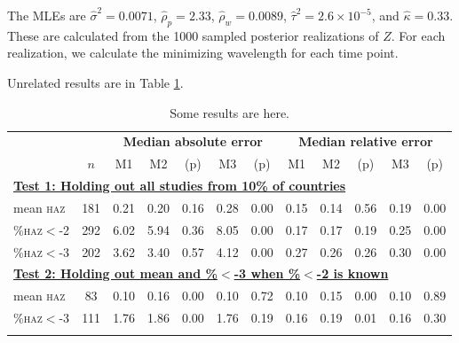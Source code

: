 \documentclass[12pt]{article}
\newcommand\T{\rule{0pt}{3.5ex}}
\begin{document}
The MLEs are $\hat\sigma^2 = 0.0071$, $\hat\rho_p = 2.33$, $\hat\rho_w = 0.0089$, $\hat\tau^2 = 2.6\times 10^{-5}$, and $\hat\kappa = 0.33$. These are calculated from the 1000 sampled posterior realizations of $Z$. For each realization, we calculate the minimizing wavelength for each time point. 

Unrelated results are in Table \ref{tab:results}.
\begin{table}[!t]
\caption{Some results are here.}
\begin{center}
\begin{tabular}{lc||c|cc|cc||c|cc|cc}
\hline
&& \multicolumn{5}{c||}{\textbf{Median absolute error}}& \multicolumn{5}{c}{\textbf{Median relative error}}\\
 & $n$ & M1 & M2 & (p) & M3 & (p) & M1 & M2 & (p) & M3 & (p) \\ 
  \hline
  \multicolumn{12}{l}{\textbf{\underline{Test 1: Holding out all studies from 10\% of countries}}} \T \\
mean \textsc{haz} & 181 & 0.21 & 0.20 & 0.16 & 0.28 & 0.00 & 0.15 & 0.14 & 0.56 & 0.19 & 0.00 \\ 
  \%\textsc{haz}$<$-2 & 292 & 6.02 & 5.94 & 0.36 & 8.05 & 0.00 & 0.17 & 0.17 & 0.19 & 0.25 & 0.00 \\ 
  \%\textsc{haz}$<$-3 & 202 & 3.62 & 3.40 & 0.57 & 4.12 & 0.00 & 0.27 & 0.26 & 0.26 & 0.30 & 0.00 \\ 
  \multicolumn{12}{l}{\textbf{\underline{Test 2: Holding out mean and \%$<$-3 when \%$<$-2 is known}}} \T \\
mean \textsc{haz} & 83 & 0.10 & 0.16 & 0.00 & 0.10 & 0.72 & 0.10 & 0.15 & 0.00 & 0.10 & 0.89 \\ 
 \%\textsc{haz}$<$-3 & 111 & 1.76 & 1.86 & 0.00 & 1.76 & 0.19 & 0.16 & 0.19 & 0.01 & 0.16 & 0.30 \\ 
   \hline
\label{tab:results}
\end{tabular}
\end{center}
\end{table}
\end{document}
